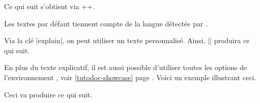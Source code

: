 \documentclass[theme = color]{tutodoc}
\begin{document}
\begin{tdocexa}
    Ce qui suit s'obtient via \tdocinlatex++.

    \medskip

    \begin{tdocshowcaseDOC}
    \end{tdocshowcaseDOC}
\end{tdocexa}


\begin{tdocnote}
    Les textes par défaut tiennent compte de la langue détectée par \thisproj.
\end{tdocnote}


\begin{tdocexa}
    Via la clé \tdocinlatex|explain|, on peut utiliser un texte personnalisé. Ainsi, \tdocinlatex|| produira ce qui suit.

    \medskip

    \begin{tdocshowcaseDOC}
    \end{tdocshowcaseDOC}
\end{tdocexa}


\begin{tdocexa}
    En plus du texte explicatif, il est aussi possible d'utiliser toutes les options de l'environnement , voir \ref{tutodoc-showcase} page \pageref{tutodoc-showcase}.
    Voici un exemple illustrant ceci.

    \medskip


    \medskip

    Ceci va produire ce qui suit.

    \medskip

    \begin{tdocshowcaseDOC}
        
    \end{tdocshowcaseDOC}
\end{tdocexa}
\end{document}

